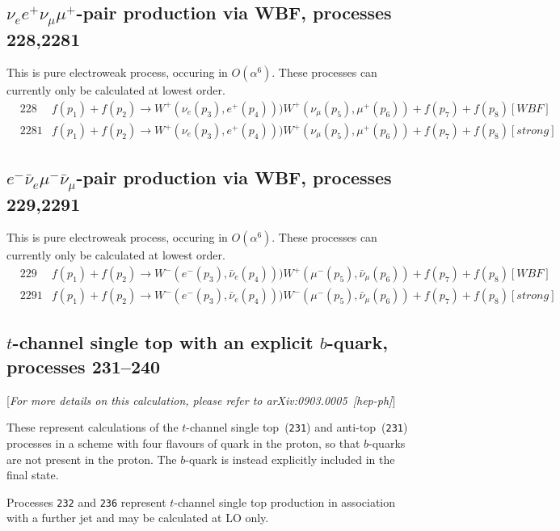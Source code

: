 \documentclass{article}
\begin{document}
{{{{{{\subsection{$\nu_{e} e^+ \nu_{\mu} \mu^+ $-pair production via WBF, processes 228,2281}
This is pure electroweak process, occuring in $O(\alpha^6)$.
These processes can currently only be calculated at lowest order.
\begin{eqnarray}
&228  &  f(p_1)+f(p_2) \to W^+(\nu_e(p_3),e^+(p_4)))W^+(\nu_\mu(p_5),\mu^+(p_6))+f(p_7)+f(p_8) [WBF]    \nonumber \\
&2281 &  f(p_1)+f(p_2) \to W^+(\nu_e(p_3),e^+(p_4)))W^+(\nu_\mu(p_5),\mu^+(p_6))+f(p_7)+f(p_8) [strong]     \nonumber
\end{eqnarray}
\subsection{$e^- \bar{\nu}_{e} \mu^- \bar{\nu}_{\mu} $-pair production via WBF, processes 229,2291}
This is pure electroweak process, occuring in $O(\alpha^6)$.
These processes can currently only be calculated at lowest order.
\begin{eqnarray}
& 229 &   f(p_1)+f(p_2) \to W^-(e^-(p_3),\bar{\nu}_e(p_4)))W^+(\mu^-(p_5),\bar{\nu}_\mu(p_6))+f(p_7)+f(p_8) [WBF]   \nonumber \\
&2291 &  f(p_1)+f(p_2) \to W^-(e^-(p_3),\bar{\nu}_e(p_4)))W^-(\mu^-(p_5),\bar{\nu}_\mu(p_6))+f(p_7)+f(p_8) [strong]  \nonumber  
\end{eqnarray}

\subsection{$t$-channel single top with an explicit $b$-quark, processes 231--240}
\label{subsec:stopb}

\begin{center}
[{\it For more details on this calculation, please refer to arXiv:0903.0005~[hep-ph]}]
\end{center}

These represent calculations of the $t$-channel single top~({\tt 231}) and anti-top~({\tt 231})
processes in a scheme with four flavours of quark in the proton, so that $b$-quarks are not present in the proton.
The $b$-quark is instead explicitly included in the final state.

Processes {\tt 232} and {\tt 236} represent $t$-channel single top production in association
with a further jet and may be calculated at LO only.

}}}}}}
\end{document}
